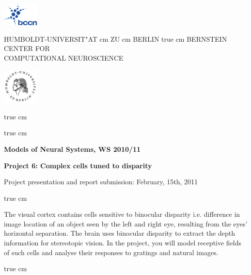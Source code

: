 \documentclass[12pt]{article}
\begin{document}
\parbox{2cm}{
\includegraphics[width=1.8cm]{bccnlogo.pdf}
}
\parbox{11cm}{
\begin{center}
\large HUMBOLDT-UNIVERSIT"AT  cm ZU  cm BERLIN
 true cm
\mgross BERNSTEIN CENTER FOR\\ COMPUTATIONAL NEUROSCIENCE
\end{center}
}
\parbox{2cm}
{
\hfill
\includegraphics[width=1.8cm]{hublogo.pdf}
}

 true cm



 true cm
\centerline{\bf Models of Neural Systems, WS 2010/11}
\centerline{\bf Project 6: Complex cells tuned to disparity}
\centerline{Project presentation and report submission: February, 15th, 2011}

 true cm


The visual cortex contains cells sensitive to binocular disparity i.e.
difference in image location of an object seen by the left and right
eye, resulting from the eyes' horizontal separation. The brain uses
binocular disparity to extract the depth information for stereotopic
vision. In the project, you will model receptive fields of such cells
and analyse their responses to gratings and natural images.


 true cm
\end{document}
